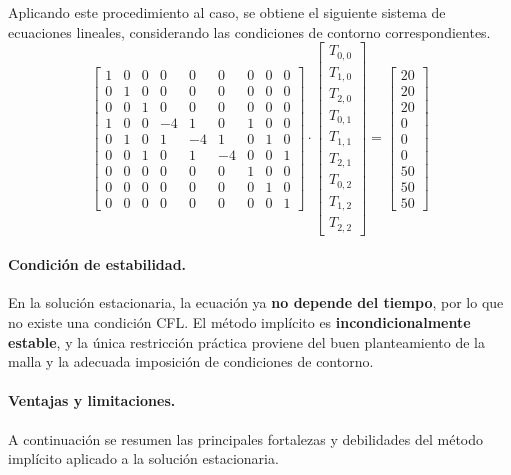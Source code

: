 \documentclass{article}
\begin{document}
Aplicando este procedimiento al caso, se obtiene el siguiente sistema de ecuaciones lineales, considerando las condiciones de contorno correspondientes. 
$$
\begin{bmatrix}
1 & 0 & 0 & 0 & 0 & 0 & 0 & 0 & 0 \\
0 & 1 & 0 & 0 & 0 & 0 & 0 & 0 & 0 \\
0 & 0 & 1 & 0 & 0 & 0 & 0 & 0 & 0 \\
1 & 0 & 0 & -4 & 1 & 0 & 1 & 0 & 0 \\
0 & 1 & 0 & 1 & -4 & 1 & 0 & 1 & 0 \\
0 & 0 & 1 & 0 & 1 & -4 & 0 & 0 & 1 \\
0 & 0 & 0 & 0 & 0 & 0 & 1 & 0 & 0 \\
0 & 0 & 0 & 0 & 0 & 0 & 0 & 1 & 0 \\
0 & 0 & 0 & 0 & 0 & 0 & 0 & 0 & 1
\end{bmatrix} \cdot
\begin{bmatrix}
T_{0,0} \\
T_{1,0} \\
T_{2,0} \\
T_{0,1} \\
T_{1,1} \\
T_{2,1} \\
T_{0,2} \\
T_{1,2} \\
T_{2,2}
\end{bmatrix} = 
\begin{bmatrix}
20 \\
20 \\
20 \\
0 \\
0 \\
0 \\
50 \\
50 \\
50
\end{bmatrix}
$$

\paragraph{Condición de estabilidad.} En la solución estacionaria, la ecuación ya \textbf{no depende del tiempo}, por lo que no existe una condición CFL. El método implícito es \textbf{incondicionalmente estable}, y la única restricción práctica proviene del buen planteamiento de la malla y la adecuada imposición de condiciones de contorno.

\paragraph{Ventajas y limitaciones.} A continuación se resumen las principales fortalezas y debilidades del método implícito aplicado a la solución estacionaria.
\end{document}
